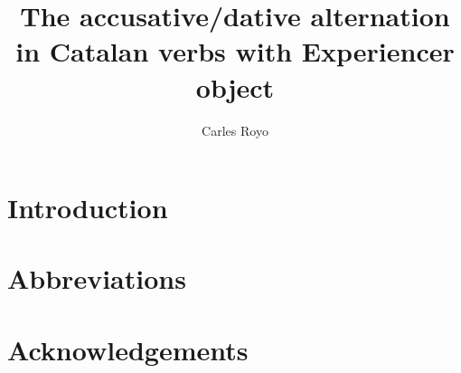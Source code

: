 \documentclass[output=paper]{langsci/langscibook}
\author{Carles Royo\affiliation{}}
\title{The accusative/dative alternation in Catalan verbs with Experiencer object}
\begin{document}
\section{Introduction}  
 
\section*{Abbreviations}
\section*{Acknowledgements}

\sloppy
\printbibliography[heading=subbibliography,notkeyword=this] 
\end{document}
